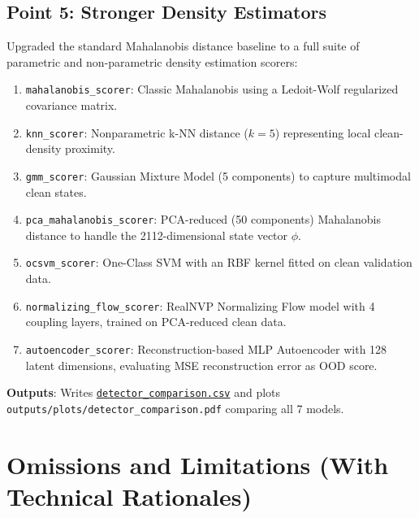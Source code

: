 \documentclass[11pt,a4paper]{article}
\begin{document}
\subsection{Point 5: Stronger Density Estimators}
Upgraded the standard Mahalanobis distance baseline to a full suite of parametric and non-parametric density estimation scorers:
\begin{enumerate}
    \item \texttt{mahalanobis\_scorer}: Classic Mahalanobis using a Ledoit-Wolf regularized covariance matrix.
    \item \texttt{knn\_scorer}: Nonparametric k-NN distance ($k=5$) representing local clean-density proximity.
    \item \texttt{gmm\_scorer}: Gaussian Mixture Model (5 components) to capture multimodal clean states.
    \item \texttt{pca\_mahalanobis\_scorer}: PCA-reduced (50 components) Mahalanobis distance to handle the 2112-dimensional state vector $\phi$.
    \item \texttt{ocsvm\_scorer}: One-Class SVM with an RBF kernel fitted on clean validation data.
    \item \texttt{normalizing\_flow\_scorer}: RealNVP Normalizing Flow model with 4 coupling layers, trained on PCA-reduced clean data.
    \item \texttt{autoencoder\_scorer}: Reconstruction-based MLP Autoencoder with 128 latent dimensions, evaluating MSE reconstruction error as OOD score.
\end{enumerate}
\textbf{Outputs}: Writes \href{run:outputs/tables/detector_comparison.csv}{\texttt{detector\_comparison.csv}} and plots \texttt{outputs/plots/detector\_comparison.pdf} comparing all 7 models.

\section{Omissions and Limitations (With Technical Rationales)}
\end{document}
